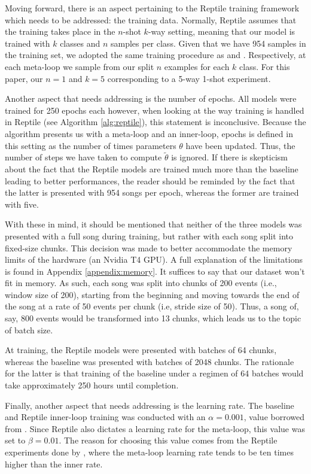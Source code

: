 \documentclass[a4paper]{book}
\begin{document}
Moving forward, there is an aspect pertaining to the Reptile training framework which needs to be addressed: the training data. Normally, Reptile assumes that the training takes place in the $n$-shot $k$-way setting, meaning that our model is trained with $k$ classes and $n$ samples per class. Given that we have 954 samples in the training set, we adopted the same training procedure as \textcite{nichol_first-order_2018} and \textcite{clouatre_figr_2019}. Respectively, at each meta-loop we sample from our split $n$ examples for each $k$ class. For this paper, our $n=1$ and $k=5$ corresponding to a 5-way 1-shot experiment.

Another aspect that needs addressing is the number of epochs. All models were trained for 250 epochs each however, when looking at the way training is handled in Reptile (see Algorithm \ref{alg:reptile}), this statement is inconclusive. Because the algorithm presents us with a meta-loop and an inner-loop, epochs is defined in this setting as the number of times parameters $\theta$ have been updated. Thus, the number of steps we have taken to compute $\tilde \theta$ is ignored. If there is skepticism about the fact that the Reptile models are trained much more than the baseline leading to better performances, the reader should be reminded by the fact that the latter is presented with 954 songs per epoch, whereas the former are trained with five.

With these in mind, it should be mentioned that neither of the three models was presented with a full song during training, but rather with each song split into fixed-size chunks. This decision was made to better accommodate the memory limits of the hardware (an Nvidia T4 GPU). A full explanation of the limitations is found in Appendix \ref{appendix:memory}. It suffices to say that our dataset won't fit in memory. As such, each song was split into chunks of 200 events (i.e., window size of 200), starting from the beginning and moving towards the end of the song at a rate of 50 events per chunk (i.e, stride size of 50). Thus, a song of, say, 800 events would be transformed into 13 chunks, which leads us to the topic of batch size.

At training, the Reptile models were presented with batches of 64 chunks, whereas the baseline was presented with batches of 2048 chunks. The rationale for the latter is that training of the baseline under a regimen of 64 batches would take approximately 250 hours until completion.

Finally, another aspect that needs addressing is the learning rate. The baseline and Reptile inner-loop training was conducted with an $\alpha = 0.001$, value borrowed from \textcite{oore_this_2018}. Since Reptile also dictates a learning rate for the meta-loop, this value was set to $\beta = 0.01$. The reason for choosing this value comes from the Reptile experiments done by \textcite{nichol_first-order_2018}, where the meta-loop learning rate tends to be ten times higher than the inner rate. 
\end{document}
